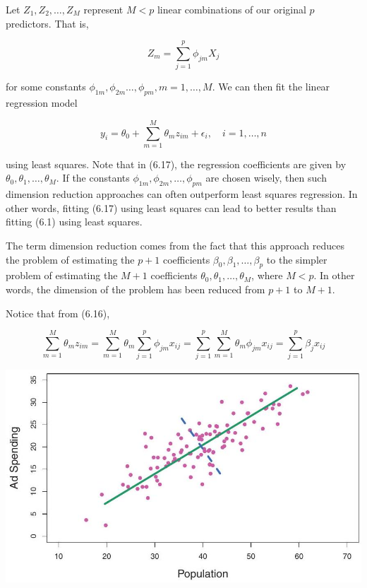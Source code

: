 \documentclass[10pt]{article}
\begin{document}
Let $Z_{1}, Z_{2}, \ldots, Z_{M}$ represent $M<p$ linear combinations of our original $p$ predictors. That is,


\begin{equation*}
Z_{m}=\sum_{j=1}^{p} \phi_{j m} X_{j} \tag{6.16}
\end{equation*}


for some constants $\phi_{1 m}, \phi_{2 m} \ldots, \phi_{p m}, m=1, \ldots, M$. We can then fit the linear regression model


\begin{equation*}
y_{i}=\theta_{0}+\sum_{m=1}^{M} \theta_{m} z_{i m}+\epsilon_{i}, \quad i=1, \ldots, n \tag{6.17}
\end{equation*}


using least squares. Note that in (6.17), the regression coefficients are given by $\theta_{0}, \theta_{1}, \ldots, \theta_{M}$. If the constants $\phi_{1 m}, \phi_{2 m}, \ldots, \phi_{p m}$ are chosen wisely, then such dimension reduction approaches can often outperform least squares regression. In other words, fitting (6.17) using least squares can lead to better results than fitting (6.1) using least squares.

The term dimension reduction comes from the fact that this approach reduces the problem of estimating the $p+1$ coefficients $\beta_{0}, \beta_{1}, \ldots, \beta_{p}$ to the simpler problem of estimating the $M+1$ coefficients $\theta_{0}, \theta_{1}, \ldots, \theta_{M}$, where $M<p$. In other words, the dimension of the problem has been reduced from $p+1$ to $M+1$.

Notice that from (6.16),

$$
\sum_{m=1}^{M} \theta_{m} z_{i m}=\sum_{m=1}^{M} \theta_{m} \sum_{j=1}^{p} \phi_{j m} x_{i j}=\sum_{j=1}^{p} \sum_{m=1}^{M} \theta_{m} \phi_{j m} x_{i j}=\sum_{j=1}^{p} \beta_{j} x_{i j}
$$

\begin{center}
\includegraphics[max width=\textwidth]{2025_05_05_efe77898333945044de4g-245}
\end{center}
\end{document}

